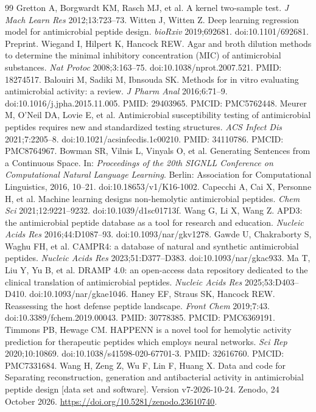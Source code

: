 \documentclass[unnumsec,webpdf,contemporary,large]{oup-authoring-template}
\begin{document}
\begin{thebibliography}{99}
 Gretton A, Borgwardt KM, Rasch MJ, et al. A kernel two-sample test. \textit{J Mach Learn Res} 2012;13:723--73.
 Witten J, Witten Z. Deep learning regression model for antimicrobial peptide design. \textit{bioRxiv} 2019;692681. doi:10.1101/692681. Preprint.
 Wiegand I, Hilpert K, Hancock REW. Agar and broth dilution methods to determine the minimal inhibitory concentration (MIC) of antimicrobial substances. \textit{Nat Protoc} 2008;3:163--75. doi:10.1038/nprot.2007.521. PMID: 18274517.
 Balouiri M, Sadiki M, Ibnsouda SK. Methods for in vitro evaluating antimicrobial activity: a review. \textit{J Pharm Anal} 2016;6:71--9. doi:10.1016/j.jpha.2015.11.005. PMID: 29403965. PMCID: PMC5762448.
 Meurer M, O'Neil DA, Lovie E, et al. Antimicrobial susceptibility testing of antimicrobial peptides requires new and standardized testing structures. \textit{ACS Infect Dis} 2021;7:2205--8. doi:10.1021/acsinfecdis.1c00210. PMID: 34110786. PMCID: PMC8764967.
 Bowman SR, Vilnis L, Vinyals O, et al. Generating Sentences from a Continuous Space. In: \textit{Proceedings of the 20th SIGNLL Conference on Computational Natural Language Learning}. Berlin: Association for Computational Linguistics, 2016, 10--21. doi:10.18653/v1/K16-1002.
 Capecchi A, Cai X, Personne H, et al. Machine learning designs non-hemolytic antimicrobial peptides. \textit{Chem Sci} 2021;12:9221--9232. doi:10.1039/d1sc01713f.
 Wang G, Li X, Wang Z. APD3: the antimicrobial peptide database as a tool for research and education. \textit{Nucleic Acids Res} 2016;44:D1087--93. doi:10.1093/nar/gkv1278.
 Gawde U, Chakraborty S, Waghu FH, et al. CAMPR4: a database of natural and synthetic antimicrobial peptides. \textit{Nucleic Acids Res} 2023;51:D377--D383. doi:10.1093/nar/gkac933.
 Ma T, Liu Y, Yu B, et al. DRAMP 4.0: an open-access data repository dedicated to the clinical translation of antimicrobial peptides. \textit{Nucleic Acids Res} 2025;53:D403--D410. doi:10.1093/nar/gkae1046.
 Haney EF, Straus SK, Hancock REW. Reassessing the host defense peptide landscape. \textit{Front Chem} 2019;7:43. doi:10.3389/fchem.2019.00043. PMID: 30778385. PMCID: PMC6369191.
 Timmons PB, Hewage CM. HAPPENN is a novel tool for hemolytic activity prediction for therapeutic peptides which employs neural networks. \textit{Sci Rep} 2020;10:10869. doi:10.1038/s41598-020-67701-3. PMID: 32616760. PMCID: PMC7331684.
 Wang H, Zeng Z, Wu F, Lin F, Huang X. Data and code for Separating reconstruction, generation and antibacterial activity in antimicrobial peptide design [data set and software]. Version v7-2026-10-24. Zenodo, 24 October 2026. \url{https://doi.org/10.5281/zenodo.23610740}.
\end{thebibliography}
\end{document}
